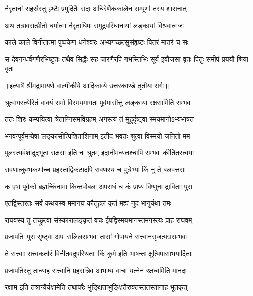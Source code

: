 \twolineshloka
{नैरृतानां सहस्रैस्तु हृष्टैः प्रमुदितैः सदा}
{अचिरेणैककालेन सम्पूर्णा तस्य शासनात्} %

\twolineshloka
{अथ तत्रावसत्प्रीतो धर्मात्मा नैरृताधिपः}
{समुद्रपरिधानायां लङ्कायां विश्रवात्मजः} %

\twolineshloka
{काले काले विनीतात्मा पुष्पकेण धनेश्वरः}
{अभ्यगच्छत्सुसंहृष्टः पितरं मातरं च सः} %

\fourlineindentedshloka
{स देवगन्धर्वगणैरभिष्टुतः}
{तथैव सिद्धैः सह चारणैरपि}
{गभस्तिभिः सूर्य इवौजसा वृतः}
{पितुः समीपं प्रययौ श्रिया वृतः} %


{॥इत्यार्षे श्रीमद्रामायणे वाल्मीकीये आदिकाव्ये उत्तरकाण्डे तृतीयः सर्गः॥}


\twolineshloka
{श्रुत्वागस्त्येरितं वाक्यं रामो विस्मयमागतः}
{पूर्वमासीत्तु लङ्कायां रक्षसामिति सम्भवः} %

\twolineshloka
{ततः शिरः कम्पयित्वा त्रेताग्निसमविग्रहम्}
{अगस्त्यं तं मुहुर्दृष्ट्वा स्मयमानोऽभ्यभाषत} %

\twolineshloka
{भगवन्पूर्वमप्येषा लङ्कासीत्पिशिताशिनाम्}
{इतीदं भवतः श्रुत्वा विस्मयो जनितो मम} %

\twolineshloka
{पुलस्त्यवंशादुद्भूता राक्षसा इति नः श्रुतम्}
{इदानीमन्यतश्चापि सम्भवः कीर्तितस्त्वया} %

\twolineshloka
{रावणात्कुम्भकर्णाच्च प्रहस्ताद्विकटादपि}
{रावणस्य च पुत्रेभ्यः किं नु ते बलवत्तराः} %

\twolineshloka
{क एषां पूर्वको ब्रह्मन्किंनामा किन्तपोबलः}
{अपराधं च कं प्राप्य विष्णुना द्राविताः पुरा} %

\twolineshloka
{एतद्विस्तरतः सर्वं कथयस्व ममानघ}
{कौतूहलं कृतं मह्यं नुद भानुर्यथा तमः} %

\twolineshloka
{राघवस्य तु तच्छ्रुत्वा संस्कारालङ्कृतं वचः}
{ईषद्विस्मयमानस्तमगस्त्यः प्राह राघवम्} %

\twolineshloka
{प्रजापतिः पुरा सृष्ट्वा अपः सलिलसम्भवः}
{तासां गोपायने सत्त्वानसृजत्पद्मसम्भवः} %

\twolineshloka
{ते सत्त्वाः सत्त्वकर्तारं विनीतवदुपस्थिताः}
{किं कुर्म इति भाषन्तः क्षुत्पिपासाभयार्दिताः} %

\twolineshloka
{प्रजापतिस्तु तान्याह सत्त्वानि प्रहसन्निव}
{आभाष्य वाचा यत्नेन रक्षध्वमिति मानदः} %

\twolineshloka
{रक्षाम इति तत्रान्यैर्यक्षामेति तथापरैः}
{भुङ्क्षिताभुङ्क्षितैरुक्तस्ततस्तानाह भूतकृत्} %

